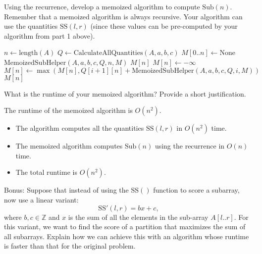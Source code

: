\documentclass[11pt,fleqn]{exam}
\newenvironment{soln}{\color{solnblue}}{}
\newcommand{\subsum}{\mbox{SS}}
\newcommand{\sub}{\mbox{Sub}}
\newif\ifsolutions\solutionstrue
\newif\ifsolutions\solutionsfalse
\begin{document}
\begin{questions}
\begin{soln}
\end{soln}

\ifsolutions

\else
\fi

\question[5]
Using the recurrence, develop a memoized algorithm to compute $\sub(n)$. Remember that a memoized algorithm is always recursive. Your algorithm can use the quantities $\subsum(l,r)$ (since these values can be pre-computed by your algorithm from part 1 above).

\begin{soln}
   \begin{algorithmic}[1]
         \State $n \gets \mbox{length}(A)$
         \State $Q \gets \mbox{CalculateAllQuantities}(A, a, b, c)$
         \State $M[0..n] \gets \mbox{None}$ 
         \State \Return $\mbox{MemoizedSubHelper}(A, a, b, c, Q, n, M)$
      \EndFunction
      \State
            \State {}
         \EndIf
            \State \Return $M[n]$
         \EndIf
         \State $M[n] \gets -\infty$  
            \State $M[n] \gets \max(M[n], Q[i+1][n] + \mbox{MemoizedSubHelper}(A, a, b, c, Q, i, M))$
         \EndFor
         \State \Return $M[n]$
      \EndFunction
\end{algorithmic}

\end{soln}


\ifsolutions

\else
\fi


\question[2]
What is the runtime of your memoized algorithm?  Provide a short justification.

\begin{soln}
   The runtime of the memoized algorithm is $O(n^2)$.
   \begin{itemize}
      \item The algorithm computes all the quantities $\subsum(l,r)$ in $O(n^2)$ time.
      \item The memoized algorithm computes $\sub(n)$ using the recurrence in $O(n)$ time.
      \item The total runtime is $O(n^2)$.
   \end{itemize}
\end{soln}

\ifsolutions

\else
\fi

\question[3]
Bonus: Suppose that instead of using the $\subsum()$ function to score a subarray, now use a linear variant:
\[
    \subsum'(l,r) = bx + c,
\]
where $b, c \in \mathbb{Z}$ and $x$ is the sum of all the elements in the sub-array $A[l..r]$. For this variant, we want to find the score of a partition that maximizes the sum of all subarrays.  Explain how we can achieve this with an algorithm whose runtime is faster than that for the original problem.

\ifsolutions

\else
\fi

\end{questions}
\end{document}

